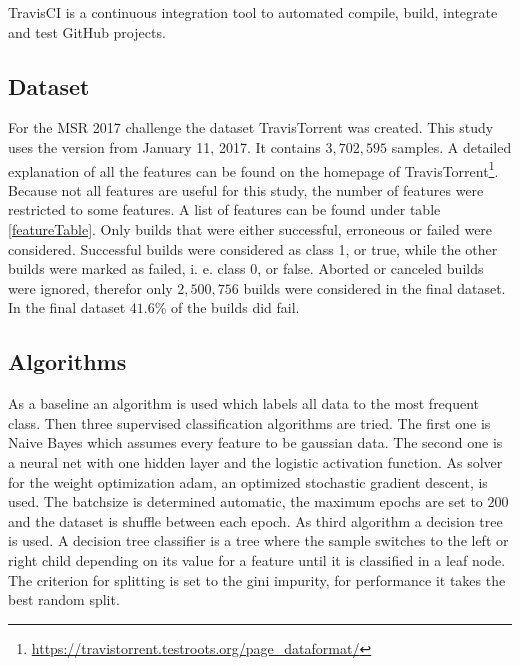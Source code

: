 \documentclass[a4paper,11pt]{article}
\begin{document}
TravisCI is a continuous integration tool to automated compile, build, integrate and test GitHub projects. 

\subsection{Dataset}

For the MSR 2017 challenge the dataset TravisTorrent was created. This study uses the version from January 11, 2017. It contains $3,702,595$ samples. A detailed explanation of all the features can be found on the homepage of TravisTorrent\footnote{\url{https://travistorrent.testroots.org/page_dataformat/}}. Because not all features are useful for this study, the number of features were restricted to some features. A list of features can be found under table \ref{featureTable}. Only builds that were either successful, erroneous or failed were considered. Successful builds were considered as class 1, or true, while the other builds were marked as failed, i. e. class 0, or false. Aborted or canceled builds were ignored, therefor only $2,500,756$ builds were considered in the final dataset. In the final dataset $41.6\%$ of the builds did fail. 




\subsection{Algorithms}

As a baseline an algorithm is used which labels all data to the most frequent class. Then three supervised classification algorithms are tried. 
The first one is Naive Bayes which assumes every feature to be gaussian data. 
The second one is a neural net with one hidden layer and the logistic activation function. As solver for the weight optimization adam\cite{adam}, an optimized stochastic gradient descent, is used. The batchsize is determined automatic, the maximum epochs are set to $200$ and the dataset is shuffle between each epoch.
As third algorithm a decision tree is used. A decision tree classifier is a tree where the sample switches to the left or right child depending on its value for a feature until it is classified in a leaf node. The criterion for splitting is set to the gini impurity, for performance it takes the best random split. 

\end{document}
